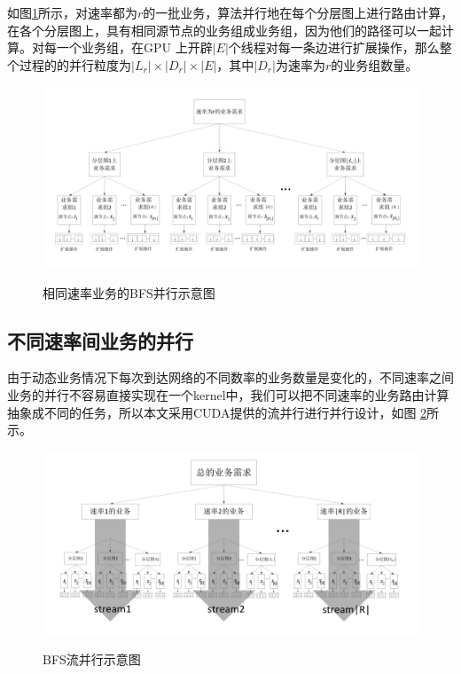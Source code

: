 如图\ref{bfs}所示，对速率都为$r$的一批业务，算法并行地在每个分层图上进行路由计算，在各个分层图上，具有相同源节点的业务组成业务组，因为他们的路径可以一起计算。对每一个业务组，在GPU 上开辟$|E|$个线程对每一条边进行扩展操作，那么整个过程的的并行粒度为$|L_r|\times|D_r|\times|E|$，其中$|D_r|$为速率为$r$的业务组数量。
\begin{figure}
\setlength{\abovecaptionskip}{-0.5cm}
\begin{center}
{\includegraphics[width=1 \textwidth]{figures/bfs.pdf}}
\end{center}
\caption{{\footnotesize{相同速率业务的BFS并行示意图}}}
\label{bfs}
\end{figure}
\subsection{不同速率间业务的并行}
由于动态业务情况下每次到达网络的不同数率的业务数量是变化的，不同速率之间业务的并行不容易直接实现在一个kernel中，我们可以把不同速率的业务路由计算抽象成不同的任务，所以本文采用CUDA提供的流并行进行并行设计，如图 \ref{bfssteam}所示。
\begin{figure}
\setlength{\abovecaptionskip}{-0.5cm}
\begin{center}
{\includegraphics[width=1 \textwidth]{figures/hbfs.pdf}}
\end{center}
\caption{{\footnotesize{BFS流并行示意图}}}
\label{bfssteam}
\end{figure}

